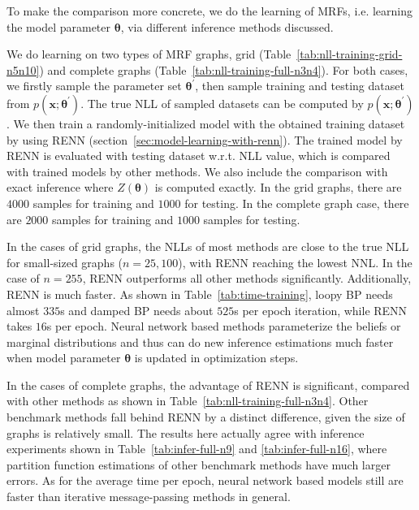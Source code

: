 To make the comparison more concrete, we do the learning of MRFs, i.e. learning the model parameter $\bm{\theta}$, via different inference methods discussed.


We do learning on two types of MRF graphs, grid (Table~\ref{tab:nll-training-grid-n5n10}) and complete graphs (Table~\ref{tab:nll-training-full-n3n4}). For both cases, we firstly sample the parameter set $\bm{\theta}^{\prime}$, then sample training and testing dataset from $p(\bm{x}; \bm{\theta}^{\prime})$. The true NLL of sampled datasets can be computed by $p(\bm{x}; \bm{\theta}^{\prime})$. We then train a randomly-initialized model with the obtained training dataset by using RENN (section~\ref{sec:model-learning-with-renn}). The trained model by RENN is evaluated with testing dataset w.r.t. NLL value, which is compared with trained models by other methods. We also include the comparison with exact inference where $Z(\bm{\theta})$ is computed exactly.
In the grid graphs, there are $4000$ samples for training and $1000$ for testing. In the complete graph case, there are $2000$ samples for training and $1000$ samples for testing. 

In the cases of grid graphs, the NLLs of most methods are close to the true NLL for small-sized graphs ($n=25,100$), with RENN reaching the lowest NNL. In the case of $n=255$, RENN outperforms all other methods significantly. Additionally, RENN is much faster. As shown in Table~\ref{tab:time-training}, loopy BP needs almost $335$s and damped BP needs about $525$s per epoch iteration, while RENN takes $16$s per epoch.
Neural network based methods parameterize the beliefs or marginal distributions and thus can do new inference estimations much faster when model parameter $\bm{\theta}$ is updated in optimization steps. %



In the cases of complete graphs, the advantage of RENN is significant, compared with other methods as shown in Table~\ref{tab:nll-training-full-n3n4}. Other benchmark methods fall behind RENN by a distinct difference, given the size of graphs is relatively small. The results here actually agree with inference experiments shown in Table~\ref{tab:infer-full-n9} and \ref{tab:infer-full-n16}, where partition function estimations of other benchmark methods have much larger errors. As for the average time per epoch, neural network based models still are faster than iterative message-passing methods in general.


